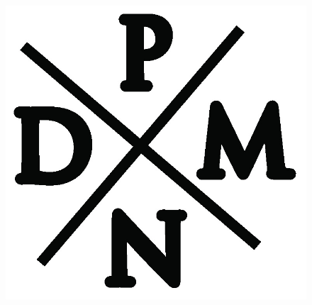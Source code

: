 \documentclass[12pt, a4paper, oneside]{report}
\begin{document}
\phantom{grrr}
\begin{figure}[b]
\centering
\includegraphics[scale=0.1]{telepitelous}
\end{figure}
\end{document}

